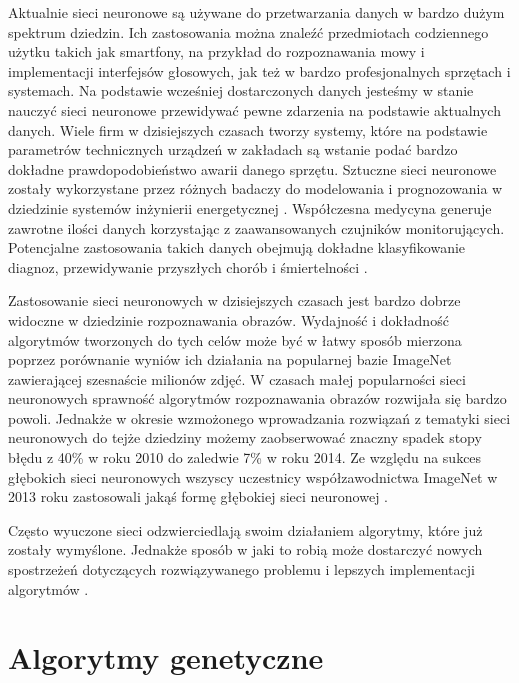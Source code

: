 \documentclass[12pt, oneside, a4paper]{report}
\begin{document}
Aktualnie sieci neuronowe są używane do przetwarzania danych w bardzo dużym spektrum dziedzin. Ich zastosowania można znaleźć przedmiotach codziennego użytku takich jak smartfony, na przykład do rozpoznawania mowy i implementacji interfejsów głosowych, jak też w bardzo profesjonalnych sprzętach i systemach. Na podstawie wcześniej dostarczonych danych jesteśmy w stanie nauczyć sieci neuronowe przewidywać pewne zdarzenia na podstawie aktualnych danych. Wiele firm w dzisiejszych czasach tworzy systemy, które na podstawie parametrów technicznych urządzeń w zakładach są wstanie podać bardzo dokładne prawdopodobieństwo awarii danego sprzętu. Sztuczne sieci neuronowe zostały wykorzystane przez różnych badaczy do modelowania i prognozowania w dziedzinie systemów inżynierii energetycznej \citep{kalogirou2000applications}. Współczesna medycyna generuje zawrotne ilości danych korzystając z zaawansowanych czujników monitorujących. Potencjalne zastosowania takich danych obejmują dokładne klasyfikowanie diagnoz, przewidywanie przyszłych chorób i śmiertelności \citep{lipton2015learning}.

Zastosowanie sieci neuronowych w dzisiejszych czasach jest bardzo dobrze widoczne w dziedzinie rozpoznawania obrazów. Wydajność i dokładność algorytmów tworzonych do tych celów może być w łatwy sposób mierzona poprzez porównanie wyniów ich działania na popularnej bazie ImageNet \citep{image-net} zawierającej szesnaście milionów zdjęć. W czasach małej popularności sieci neuronowych sprawność algorytmów rozpoznawania obrazów rozwijała się bardzo powoli. Jednakże w okresie wzmożonego wprowadzania rozwiązań z tematyki sieci neuronowych do tejże dziedziny możemy zaobserwować znaczny spadek stopy błędu z 40\% w roku 2010 do zaledwie 7\% w roku 2014. Ze względu na sukces głębokich sieci neuronowych wszyscy uczestnicy współzawodnictwa ImageNet w 2013 roku zastosowali jakąś formę głębokiej sieci neuronowej \citep{roelants2017deeplearning}.

Często wyuczone sieci odzwierciedlają swoim działaniem algorytmy, które już zostały wymyślone. Jednakże sposób w jaki to robią może dostarczyć nowych spostrzeżeń dotyczących rozwiązywanego problemu i lepszych implementacji algorytmów \citep{murray1995applications}.



\chapter{Algorytmy genetyczne}
\end{document}
